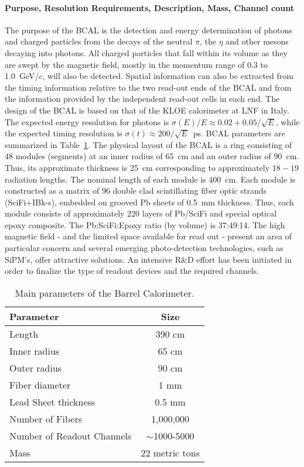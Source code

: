 \documentclass[11pt]{article}
\begin{document}
\paragraph{Purpose, Resolution Requirements, Description, Mass, Channel count}
The purpose of the BCAL is the detection and energy determination
of photons and charged particles from the decays of the neutral
$\pi$, the $\eta$ and other mesons decaying into photons.  All
charged particles that fall within its volume as they are swept
by the magnetic field, mostly in the momentum range of 0.3 to 1.0~GeV/$c$,
will also be detected.  Spatial information can also be extracted
from the timing information relative to the two read-out ends of the 
BCAL and from the  information provided by the independent read-out cells in each end.
The design of the BCAL is based on that of the KLOE calorimeter at LNF
in Italy. The expected energy resolution for photons is
$\sigma(E)/E\approx 0.02+0.05/\sqrt{E}$, while the expected timing
resolution is $\sigma(t)\approx 200/\sqrt{E}$~ps.  BCAL parameters are
summarized in Table~\ref{bcalparams}.
The physical layout of the
BCAL is a ring consisting of $48$ modules (segments) at an inner radius
of 65~cm and an outer radius of 90~cm.   Thus, its  approximate thickness
is 25~cm corresponding to approximately $18-19$ radiation lengths. The nominal
length of each module is 400~cm.  Each module is constructed as a matrix
of $96$ double clad scintillating fiber optic strands (SciFi+IBk-s), embedded
on grooved Pb sheets of 0.5~mm thickness. Thus, each module consists of
approximately $220$ layers of Pb/SciFi and special optical epoxy composite.  The 
Pb:SciFi:Epoxy ratio (by volume) is 37:49:14.
The high magnetic field - and the limited space available for read out - present an 
area of particular concern and several emerging photo-detection technologies, such
as SiPM's, offer attractive solutions.  An intensive R\&D effort has been initiated in order
to finalize the type of readout devices and the required channels.

\begin{table}[h!]\centering
\caption{Main parameters of the Barrel Calorimeter.}
\begin{tabular}{|l|c|}
\hline
Parameter & Size \\ \hline
Length & 390 cm  \\
Inner radius & 65 cm  \\
Outer radius & 90 cm  \\
Fiber diameter & 1 mm  \\
Lead Sheet thickness & 0.5 mm \\
Number of Fibers & 1,000,000\\
Number of Readout Channels & $\sim$1000-5000 \\
Mass & 22 metric tons \\
\hline
\end{tabular}
\label{bcalparams}
\end{table}
\end{document}
